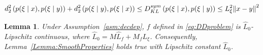 \documentclass[10pt,a4paper]{amsart}
\newtheorem{lemma}{Lemma}
\newcommand{\us}[1]{\textcolor{red}{#1}}
\begin{document}
				\begin{equation}\label{eq:KBbound}
					d^2_2\left(p(\xi \mid x),p(\xi \mid y)\right)+d^2_2\left(p(\xi \mid y),p(\xi \mid x)\right) \leq D_{{\textnormal{KL}}}^{{\rm sym}}\left(p(\xi \mid x),p(\xi \mid y)\right) \leq L_\xi^2{\|x-y\|}^2
				\end{equation}

						\begin{lemma}\label{lem:f-decdep1-Lip}
							Under Assumption~\ref{asm:decdep}, $f$ defined in \eqref{eq:DDproblem} is $\hat{L}_0$-Lipschitz continuous, where $\hat{L}_0=M \hat{L}_f+M_fL_\xi$. Consequently, Lemma~\ref{Lemma:SmoothProperties} holds true with Lipschitz constant $\hat{L}_0$. %
						\end{lemma}
\end{document}
